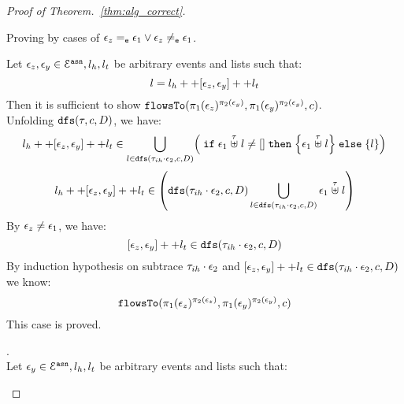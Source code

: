 \begin{proof}[Proof of Theorem.~\ref{thm:alg_correct}]
\begin{case}
\begin{subcase}
\[\] 
%
Proving by cases of $\mathtt{\epsilon}_z =_{\mathtt{e}} \mathtt{\epsilon}_1 \lor \mathtt{\epsilon}_z \neq_{\mathtt{e}} \mathtt{\epsilon}_1$.
\begin{subsubcase}
Let $\mathtt{\epsilon}_z, \mathtt{\epsilon}_y \in \mathcal{E}^{\mathtt{{asn}}}, l_h, l_t$ be arbitrary events and lists such that:
\[
  l = l_h ++ [\mathtt{\epsilon}_z, \mathtt{\epsilon}_y] ++ l_t 
\]
%
Then it is sufficient to show $\mathtt{flowsTo}(\pi_1(\mathtt{\epsilon}_z)^{\pi_2(\mathtt{\epsilon}_y)}, \pi_1(\mathtt{\epsilon}_y)^{\pi_2(\mathtt{\epsilon}_y)}, c)$.
\\
Unfolding $\mathtt{dfs}(\mathtt{\tau}, c, D)$, we have:
%
\[
  l_h ++ [\event_z, \event_y] ++ l_t  \in 
     \bigcup\limits_{l \in \kw{dfs}(\trace_{ih} \cdot \event_2, c, D) }
  \left(  \eif \event_1 \stackrel{\trace}{\uplus} l \neq [] 
  \ethen \left\{ \event_1 \stackrel{\trace}{\uplus} l \right\} \eelse \left\{ l \right\}
  \right)
\]
%
\[
  l_h ++ [\event_z, \event_y] ++ l_t  \in 
  \left(  \kw{dfs}(\trace_{ih} \cdot \event_2, c, D) \bigcup\limits_{l \in \kw{dfs}(\trace_{ih} \cdot \event_2, c, D) } \event_1 \stackrel{\trace}{\uplus} l 
  \right)
\]
%
By $\mathtt{\epsilon}_z \neq \mathtt{\epsilon}_1$, we have:
\[
  [\mathtt{\epsilon}_z, \mathtt{\epsilon}_y] ++ l_t \in \mathtt{dfs}(\mathtt{\tau}_{ih} \cdot \mathtt{\epsilon}_2, c, D)
\]
%
%
%
By induction hypothesis on subtrace $\mathtt{\tau}_{ih} \cdot \mathtt{\epsilon}_2$ and $[\mathtt{\epsilon}_z, \mathtt{\epsilon}_y] ++ l_t 
  \in \mathtt{dfs}(\mathtt{\tau}_{ih} \cdot \mathtt{\epsilon}_2, c, D)$ we know:
\[
  \mathtt{flowsTo}(\pi_1(\mathtt{\epsilon}_z)^{\pi_2(\mathtt{\epsilon}_z)}, \pi_1(\mathtt{\epsilon}_y)^{\pi_2(\mathtt{\epsilon}_y)}, c)
\]
This case is proved.
%
\end{subsubcase}
%
\begin{subsubcase}.
\\
Let $\mathtt{\epsilon}_y \in \mathcal{E}^{\mathtt{{asn}}}, l_h, l_t$ be arbitrary events and lists such that:
\[                                                                                                                                                                                                                                                                                                                                                                                                          
\]
\end{subsubcase}
\end{subcase}
\end{case}
\end{proof}
